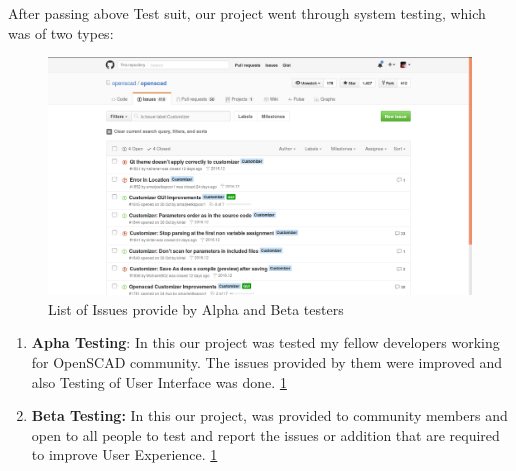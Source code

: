 After passing above Test suit, our project went through system testing, which was of two types:
\begin{figure}[H]
\centering
\includegraphics[width=\linewidth]{images/Issues}
\caption{List of Issues provide by Alpha and Beta testers}
\label{fig:Issues}
\end{figure}

\begin{enumerate}
    \item \textbf{Apha Testing}: In this our project was tested my fellow developers working for OpenSCAD community. The issues provided by them were improved and also Testing of User Interface was done. \ref{fig:Issues}
   
    \item \textbf{Beta Testing:} In this our project, was provided to community members and open to all people to test and report the issues or addition that are required to improve User Experience. \ref{fig:Issues}
   
\end{enumerate}

		
		
